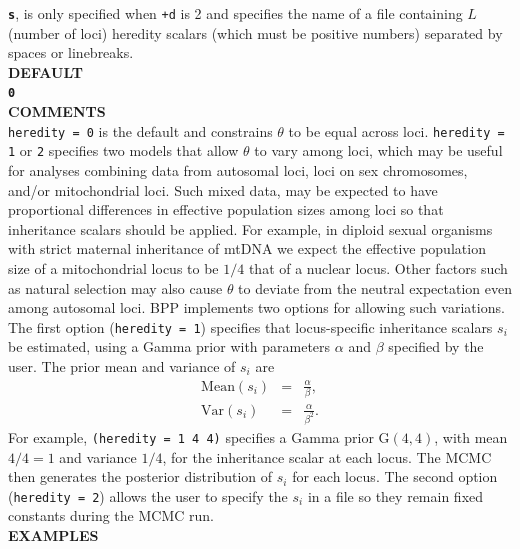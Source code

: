 \documentclass[a4paper]{book}
\numberwithin{equation}{section} \renewcommand{\baselinestretch}{0.55}
\begin{document}
\textbf{\texttt{s}}, is only specified when \texttt{+d} is 2 and
specifies the name of a file containing $L$ (number of loci) heredity
scalars (which must be positive numbers) separated by spaces or
linebreaks.
\vspace{5pt}\\
\textbf{DEFAULT} \vspace{5pt}\\
\textbf{\texttt{0}} \vspace{5pt}\\
\textbf{COMMENTS} \vspace{5pt}\\
\texttt{heredity = 0} is the default and constrains $\theta$ to be
equal across loci. \texttt{heredity = 1} or \texttt{2} specifies two
models that allow $\theta$ to vary among loci, which may be useful for
analyses combining data from autosomal loci, loci on sex chromosomes,
and/or mitochondrial loci. Such mixed data, may be expected to have
proportional differences in effective population sizes among loci so
that inheritance scalars \citep[][]{Hey2004} should be applied.  For
example, in diploid sexual organisms with strict maternal inheritance
of mtDNA we expect the effective population size of a mitochondrial
locus to be $1/4$ that of a nuclear locus.  Other factors such as
natural selection may also cause $\theta$ to deviate from the neutral
expectation even among autosomal loci.  \textsc{BPP} implements two
options for allowing such variations.  The first option
(\texttt{heredity = 1}) specifies that locus-specific inheritance
scalars $s_i$ be estimated, using a Gamma prior with parameters
$\alpha$ and $\beta$ specified by the user. The prior mean and
variance of $s_i$ are
\begin{eqnarray}
  \textrm{Mean}(s_i) & = & \frac{\alpha}{\beta}, \nonumber \\
  \textrm{Var}(s_i) & = & \frac{\alpha}{\beta^2}. \nonumber 
\end{eqnarray}
For example, \texttt{(heredity = 1 4 4)} specifies a Gamma prior
$\textrm{G}(4, 4)$, with mean $4/4 = 1$ and variance $1/4$, for the
inheritance scalar at each locus.  The MCMC then generates the
posterior distribution of $s_i$ for each locus. The second option
(\texttt{heredity = 2}) allows the user to specify the $s_i$ in a file
so they remain fixed constants during the MCMC run.
\vspace{5pt}\\
\textbf{EXAMPLES} \vspace{5pt}\\
\end{document}
